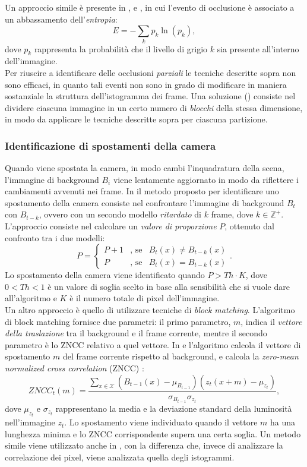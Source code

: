 Un approccio simile \`e presente in \cite{harasse2004automated}, \cite{gil2007automatic} e \cite{ellwart2012camera}, in cui l'evento di occlusione \`e associato a un abbassamento dell'\textit{entropia}:
 \[
 \label{eq:entropy}
 E=-\sum_{k}p_k\ln(p_k) ,
 \]
 dove $p_k$ rappresenta la probabilit\`a che il livello di grigio $k$ sia presente all'interno dell'immagine. \\
 Per riuscire a identificare delle occlusioni \textit{parziali} le tecniche descritte sopra non sono efficaci, in quanto tali eventi non sono in grado di modificare in maniera sostanziale la struttura dell'istogramma dei frame.
 Una soluzione (\cite{gil2007automatic}) consiste nel dividere ciascuna immagine in un certo numero di \textit{blocchi} della stessa dimensione, in modo da applicare le tecniche descritte sopra per ciascuna partizione.
\subsubsection{Identificazione di spostamenti della camera}
Quando viene spostata la camera, in modo cambi l'inquadratura della scena, l'immagine di background $B_i$ viene lentamente aggiornato in modo da riflettere i cambiamenti avvenuti nei frame. 
In \cite{saglam2009real} il metodo proposto per identificare uno spostamento della camera consiste nel confrontare l'immagine di background $B_t$ con $B_{t-k}$, ovvero con un secondo modello \textit{ritardato} di $k$ frame, dove $k \in \mathbb{Z}^+$.
L'approccio consiste nel calcolare un \textit{valore di proporzione} $P$, ottenuto dal confronto tra i due modelli:
\[
\label{eq:displEqSaglam}
P=\left\{ \begin{array} {lcl}
P+1 & \mbox{, se} & B_t(x) \neq B_{t-k}(x) \\
P & \mbox{, se} & B_t(x) = B_{t-k}(x) \end{array} \right. .
\]
Lo spostamento della camera viene identificato quando $P > Th \cdot K$, dove $0<Th<1$ \`e un valore di soglia scelto in base alla sensibilit\`a che si vuole dare all'algoritmo e $K$ \`e il numero totale di pixel dell'immagine.\\
Un altro approccio \`e quello di utilizzare tecniche di \textit{block matching}.
L'algoritmo di block matching fornisce due parametri:
il primo parametro, $m$, indica il \textit{vettore della traslazione} tra il background e il frame corrente, mentre il secondo parametro \`e lo ZNCC relativo a quel vettore.
In \cite{gil2007automatic} e \cite{harasse2004automated} l'algoritmo calcola il vettore di spostamento $m$ del frame corrente rispetto al background, e calcola la \textit{zero-mean normalized cross correlation} (ZNCC) \cite{roma2002comparative}:
\[
ZNCC_t(m) = \frac{\sum_{x \in \mathcal{X}}(B_{t-1}(x)- \mu_{B_{t-1}})(z_t(x+m)-\mu_{z_t})}{\sigma_{B_{t-1}} \sigma_{z_t}},
\]
dove $\mu_{z_t}$ e $\sigma_{z_t}$ rappresentano la media e la deviazione standard della luminosit\`a nell'immagine $z_t$.
Lo spostamento viene individuato quando il vettore $m$ ha una lunghezza minima e lo ZNCC corrispondente supera una certa soglia.
Un metodo simile viene utilizzato anche in \cite{kryjak2012fpga}, con la differenza che, invece di analizzare la correlazione dei pixel, viene analizzata quella degli istogrammi. 
